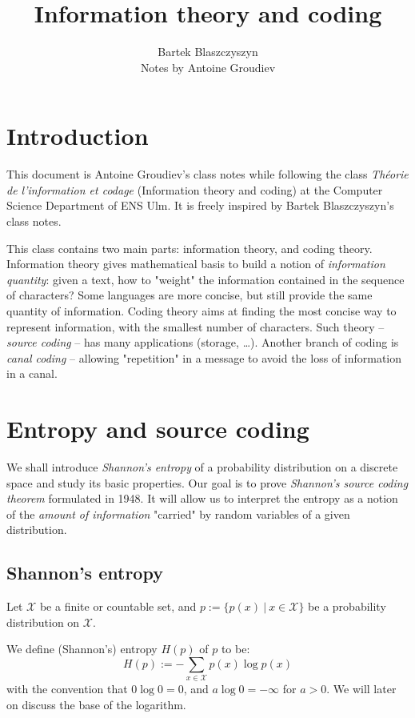\documentclass{../cs-classes/cs-classes}
\title{Information theory and coding}
\author{Bartek Blaszczyszyn\\ Notes by Antoine Groudiev}
\newcommand*{\X}{\mathcal{X}}
\begin{document}
\section*{Introduction}
This document is Antoine Groudiev's class notes while following the class \emph{Théorie de l'information et codage} (Information theory and coding) at the Computer Science Department of ENS Ulm. It is freely inspired by Bartek Blaszczyszyn's class notes. 

This class contains two main parts: information theory, and coding theory. Information theory gives mathematical basis to build a notion of \emph{information quantity}: given a text, how to "weight" the information contained in the sequence of characters? Some languages are more concise, but still provide the same quantity of information. Coding theory aims at finding the most concise way to represent information, with the smallest number of characters. Such theory -- \emph{source coding} -- has many applications (storage, \dots). Another branch of coding is \emph{canal coding} -- allowing "repetition" in a message to avoid the loss of information in a canal.

\section{Entropy and source coding}
We shall introduce \emph{Shannon’s entropy} of a probability distribution on a discrete space and study its basic properties. Our goal is to prove \emph{Shannon’s source coding theorem} formulated in 1948. It will allow us to interpret the entropy as a notion of the \emph{amount of information} "carried" by random variables of a given distribution.

\subsection{Shannon's entropy}
Let $\X$ be a finite or countable set, and $p := \{p(x) \: | \: x\in \X \}$ be a probability distribution on $\mathcal{X}$.

\begin{definition} We define (Shannon's) entropy $H(p)$ of $p$ to be:
\begin{equation}
    H(p) := -\sum_{x\in\X}p(x)\log p(x)
\end{equation}
with the convention that $0\log 0 = 0$, and $a\log 0 = -\infty$ for $a>0$.
We will later on discuss the base of the logarithm.
\end{definition}
\end{document}
